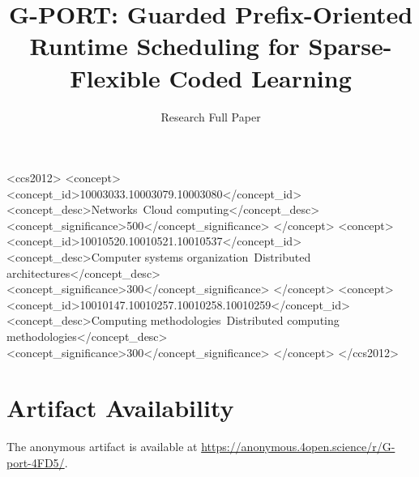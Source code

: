 \documentclass[sigconf,review,anonymous]{acmart}
\title{G-PORT: Guarded Prefix-Oriented Runtime Scheduling for Sparse-Flexible Coded Learning}
\subtitle{Research Full Paper}
\begin{document}


\begin{CCSXML}
<ccs2012>
   <concept>
       <concept_id>10003033.10003079.10003080</concept_id>
       <concept_desc>Networks~Cloud computing</concept_desc>
       <concept_significance>500</concept_significance>
   </concept>
   <concept>
       <concept_id>10010520.10010521.10010537</concept_id>
       <concept_desc>Computer systems organization~Distributed architectures</concept_desc>
       <concept_significance>300</concept_significance>
   </concept>
   <concept>
       <concept_id>10010147.10010257.10010258.10010259</concept_id>
       <concept_desc>Computing methodologies~Distributed computing methodologies</concept_desc>
       <concept_significance>300</concept_significance>
   </concept>
</ccs2012>
\end{CCSXML}



\maketitle










\section*{Artifact Availability}
The anonymous artifact is available at
\url{https://anonymous.4open.science/r/G-port-4FD5/}.



\end{document}
